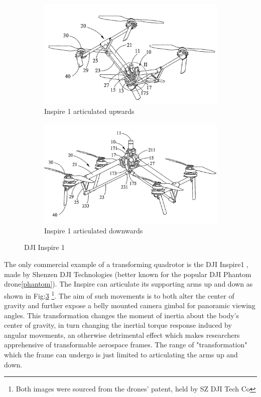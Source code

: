 \begin{figure}[hbtp]
\centering
\begin{subfigure}{.5\textwidth}
\centering
\includegraphics[width=\textwidth]{figs/dji-inspire1}
\caption{Inspire 1 articulated upwards}
\label{fig:inspireup}
\end{subfigure}%
\begin{subfigure}{.5\textwidth}
\centering
\includegraphics[width=\textwidth]{figs/dji-inspire2}
\caption{Inspire 1 articulated downwards}
\label{fig:inspiredown}
\end{subfigure}
\caption{DJI Inspire 1}
\label{fig:inspire1}
\end{figure}
The only commercial example of a transforming quadrotor is the DJI Inspire1 \cite{inspire}, made by Shenzen DJI Technologies (better known for the popular DJI Phantom drone\ref{phantom}). The Inspire can articulate its supporting arms up and down as shown in Fig:\ref{fig:inspire1} \footnote{Both images were sourced from the drones' patent, held by SZ DJI Tech Co\cite{djinspire}}. The aim of such movements is to both alter the center of gravity and further expose a belly mounted camera gimbal for panoramic viewing angles. This transformation changes the moment of inertia about the body's center of gravity, in turn changing the inertial torque response induced by angular movements, an otherwise detrimental effect which makes researchers apprehensive of transformable aerospace frames. The range of "transformation" which the frame can undergo is just limited to articulating the arms up and down.
